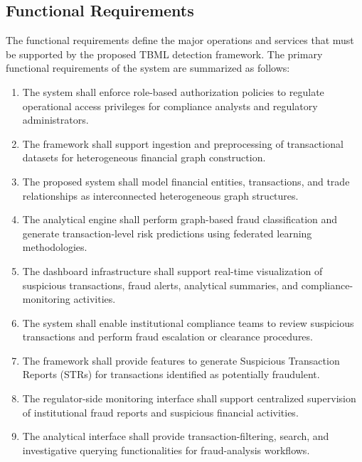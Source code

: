 \subsection[Functional Requirements]{\textbf{Functional Requirements}}

The functional requirements define the major operations and services that must be supported by the proposed TBML detection framework. The primary functional requirements of the system are summarized as follows:
\renewcommand{\theenumi}{\roman{enumi}}\renewcommand{\labelenumi}{\textbf{ (\theenumi)}}%
\begin{enumerate}

\item The system shall enforce role-based authorization policies to regulate operational access privileges for compliance analysts and regulatory administrators.

\item The framework shall support ingestion and preprocessing of transactional datasets for heterogeneous financial graph construction.

\item The proposed system shall model financial entities, transactions, and trade relationships as interconnected heterogeneous graph structures.

\item The analytical engine shall perform graph-based fraud classification and generate transaction-level risk predictions using federated learning methodologies.

\item The dashboard infrastructure shall support real-time visualization of suspicious transactions, fraud alerts, analytical summaries, and compliance-monitoring activities.

\item The system shall enable institutional compliance teams to review suspicious transactions and perform fraud escalation or clearance procedures.

\item The framework shall provide features to generate Suspicious Transaction Reports (STRs) for transactions identified as potentially fraudulent.

\item The regulator-side monitoring interface shall support centralized supervision of institutional fraud reports and suspicious financial activities.

\item The analytical interface shall provide transaction-filtering, search, and investigative querying functionalities for fraud-analysis workflows.

\end{enumerate}


